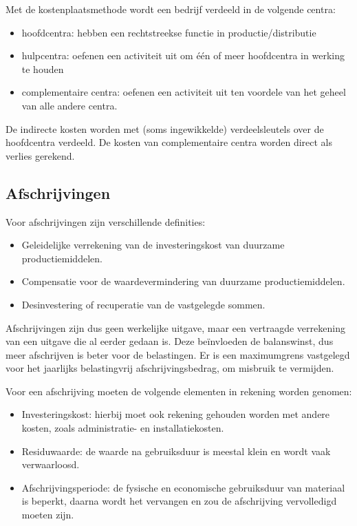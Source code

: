 \documentclass[../../samenvatting.tex]{subfiles}
\begin{document}
Met de kostenplaatsmethode wordt een bedrijf verdeeld in de volgende centra:
\begin{itemize}
    \item hoofdcentra: hebben een rechtstreekse functie in productie/distributie
    \item hulpcentra: oefenen een activiteit uit om één of meer hoofdcentra in werking te houden
    \item complementaire centra: oefenen een activiteit uit ten voordele van het geheel van alle andere centra.
\end{itemize}

De indirecte kosten worden met (soms ingewikkelde) verdeelsleutels over de hoofdcentra verdeeld. De kosten van complementaire centra worden direct als verlies gerekend.

\subsection{Afschrijvingen}
Voor afschrijvingen zijn verschillende definities:
\begin{itemize}
    \item Geleidelijke verrekening van de investeringskost van duurzame productiemiddelen.
    \item Compensatie voor de waardevermindering van duurzame productiemiddelen.
    \item Desinvestering of recuperatie van de vastgelegde sommen.
\end{itemize}

Afschrijvingen zijn dus geen werkelijke uitgave, maar een vertraagde verrekening van een uitgave die al eerder gedaan is. Deze beïnvloeden de balanswinst, dus meer afschrijven is beter voor de belastingen. Er is een maximumgrens vastgelegd voor het jaarlijks belastingvrij afschrijvingsbedrag, om misbruik te vermijden.

Voor een afschrijving moeten de volgende elementen in rekening worden genomen:
\begin{itemize}
    \item Investeringskost: hierbij moet ook rekening gehouden worden met andere kosten, zoals administratie- en installatiekosten.
    \item Residuwaarde: de waarde na gebruiksduur is meestal klein en wordt vaak verwaarloosd.
    \item Afschrijvingsperiode: de fysische en economische gebruiksduur van materiaal is beperkt, daarna wordt het vervangen en zou de afschrijving vervolledigd moeten zijn.
\end{itemize}
\end{document}

